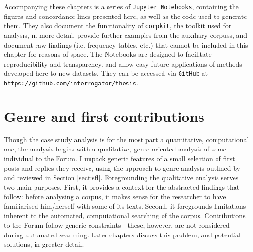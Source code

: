 Accompanying these chapters is a series of \texttt{Jupyter Notebooks}, containing the figures and concordance lines presented here, as well as the code used to generate them. They also document the functionality of \texttt{corpkit}, the toolkit used for analysis, in more detail, provide further examples from the auxiliary \glspl{corpus}, and document raw findings (i.e. frequency tables, etc.) that cannot be included in this chapter for reasons of space. The Notebooks are designed to facilitate reproducibility and transparency, and allow easy future applications of methods developed here to new datasets. They can be accessed via \texttt{GitHub} at \texttt{\href{https://github.com/interrogator/thesis}{https://github.com/interrogator/thesis}}.

\section{Genre and first contributions}

Though the case study analysis is for the most part a quantitative, computational one, the analysis begins with a qualitative, genre\hyp{}oriented analysis of some individual  to the \gls{Forum}. I unpack generic features of a small selection of first \glspl{post} and replies they receive, using the approach to genre analysis outlined by \textcite{eggins_analysing_2004} and reviewed in Section \ref{sect:sfl}.
Foregrounding the qualitative analysis serves two main purposes. First, it provides a context for the abstracted  findings that follow: before analysing a \gls{corpus}, it makes sense for the researcher to have familiarised him\slash herself with some of its texts. Second, it foregrounds limitations inherent to the automated, computational searching of the \gls{corpus}. Contributions to the \gls{Forum} follow generic constraints---these, however, are not considered during automated searching. Later chapters discuss this problem, and potential solutions, in greater detail.

